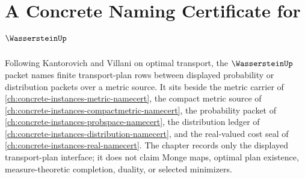\chapter{A Concrete Naming Certificate for $\WassersteinUp$}
\label{ch:concrete-instances-wasserstein-namecert}

Following Kantorovich and Villani on optimal transport, the $\WassersteinUp$ packet names finite transport-plan rows between displayed probability or distribution packets over a metric source. It sits beside the metric carrier of \autoref{ch:concrete-instances-metric-namecert}, the compact metric source of \autoref{ch:concrete-instances-compactmetric-namecert}, the probability packet of \autoref{ch:concrete-instances-probspace-namecert}, the distribution ledger of \autoref{ch:concrete-instances-distribution-namecert}, and the real-valued cost seal of \autoref{ch:concrete-instances-real-namecert}. The chapter records only the displayed transport-plan interface; it does not claim Monge maps, optimal plan existence, measure-theoretic completion, duality, or selected minimizers.

